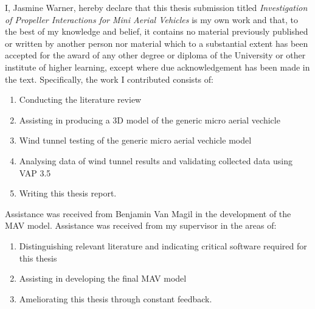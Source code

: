 
\begin{declaration}
I, Jasmine Warner, hereby declare that this thesis submission titled \emph{Investigation of Propeller Interactions for Mini Aerial Vehicles} is my own work and that, to the best of my knowledge and belief, it contains no material previously published or written by another person nor material which to a substantial extent has been accepted for the award of any other degree or diploma of the University or other institute of higher learning, except where due acknowledgement has been made in the text.  Specifically, the work I contributed consists of:

\vspace{-1.5em}

\begin{enumerate}
    \item Conducting the literature review
    \item Assisting in producing a 3D model of the generic micro aerial vechicle
    \item Wind tunnel testing of the generic micro aerial vechicle model
    \item Analysing data of wind tunnel results and validating collected data using VAP 3.5
    \item Writing this thesis report.
\end{enumerate}

\vspace{-1.5em}
Assistance was received from Benjamin Van Magil in the development of the MAV model.
Assistance was received from my supervisor in the areas of:

\vspace{-1em}

\begin{enumerate}
    \item Distinguishing relevant literature and indicating critical software required for this thesis
    \item Assisting in developing the final MAV model
    \item Ameliorating this thesis through constant feedback.
\end{enumerate}

\vspace{0.5cm}


\end{declaration}
